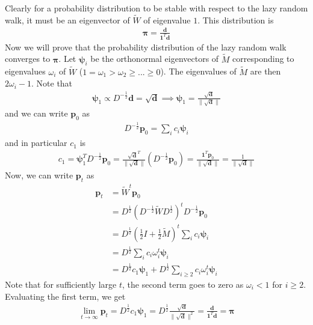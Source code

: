 \documentclass{math}
\renewcommand{\vec}[1]{\boldsymbol{#1}}
\begin{document}
Clearly for a probability distribution to be stable with respect to the lazy random walk, it must be an eigenvector of $\widetilde{W}$ of eigenvalue $1$.
This distribution is
\begin{align*}
    \vec{\pi} = \frac{\vec{d}}{\vec{1}^T\vec{d}}
\end{align*}
Now we will prove that the probability distribution of the lazy random walk converges to $\vec{\pi}$.
Let $\vec{\psi}_i$ be the orthonormal eigenvectors of $\widetilde{M}$
corresponding to eigenvalues $\omega_i$ of $\widetilde{W}$ ($1 = \omega_1 > \omega_2 \geq ... \geq 0$).
The eigenvalues of $\widetilde{M}$ are then $2 \omega_i - 1$.
Note that
\begin{align*}
    \vec{\psi}_1 \propto D^{-\frac{1}{2}} \vec{d} = \sqrt{\vec{d}} \implies \vec{\psi}_1 = \frac{\sqrt{\vec{d}}}{\lVert\sqrt{\vec{d}} \rVert }
\end{align*}
and we can write $\vec{p}_0$ as
\begin{align*}
    D^{-\frac{1}{2}}\vec{p}_0 = \sum_{i} c_i \vec{\psi}_i
\end{align*}
and in particular $c_1$ is
\begin{align*}
    c_1 = \vec{\psi}_1^T D^{-\frac{1}{2}}\vec{p}_0 = \frac{\sqrt{\vec{d}}^T}{\lVert\sqrt{\vec{d}}\rVert} (D^{-\frac{1}{2}} \vec{p}_0) = \frac{\vec{1}^T \vec{p}_0}{\lVert\sqrt{\vec{d}}\rVert} = \frac{1}{\lVert\sqrt{\vec{d}}\rVert}
\end{align*}
Now, we can write $\vec{p}_t$ as
\begin{align*}
    \vec{p}_t &= \widetilde{W}^t \vec{p}_0 \\
    &=D^{\frac{1}{2}} \left(D^{-\frac{1}{2}} \widetilde{W} D^{\frac{1}{2}}\right)^t D^{-\frac{1}{2}} \vec{p}_0 \\
    &=D^{\frac{1}{2}} \left(\frac{1}{2} I + \frac{1}{2} \widetilde{M}\right)^t \sum_{i} c_i \vec{\psi}_i \\
    &=D^{\frac{1}{2}} \sum_{i} c_i \omega_i^t \vec{\psi}_i \\
    &=D^{\frac{1}{2}} c_1 \vec{\psi}_1 + D^{\frac{1}{2}} \sum_{i \geq 2} c_i \omega_i^t \vec{\psi}_i
\end{align*}
Note that for sufficiently large $t$, the second term goes to zero as $\omega_i < 1$ for $i \geq 2$.
Evaluating the first term, we get
\begin{align*}
    \lim_{t \to \infty} \vec{p}_t = D^{\frac{1}{2}} c_1 \vec{\psi}_1 = D^{\frac{1}{2}} \frac{\sqrt{\vec{d}}}{\lVert \sqrt{\vec{d}} \rVert^2} = \frac{\vec{d}}{\vec{1}^T \vec{d}} = \vec{\pi}
\end{align*}
\end{document}
